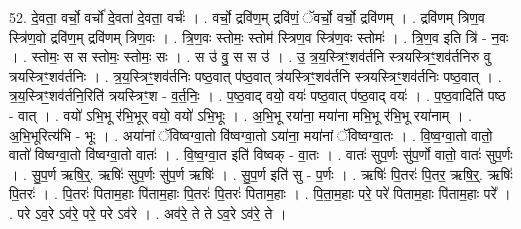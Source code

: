 \documentclass[17pt]{extarticle}
\begin{document}
52. दे॒वता॒ वर्चो॒ वर्चो॑ दे॒वता॑ दे॒वता॒ वर्चः॑ । . वर्चो॒ द्रवि॑ण॒म् द्रवि॑णं॒ ॅवर्चो॒ वर्चो॒ द्रवि॑णम् । . द्रवि॑णम् त्रिण॒व स्त्रि॑ण॒वो द्रवि॑ण॒म् द्रवि॑णम् त्रिण॒वः । . त्रि॒ण॒वः स्तोमः॒ स्तोम॑ स्त्रिण॒व स्त्रि॑ण॒वः स्तोमः॑ । . त्रि॒ण॒व इति त्रि॑ - न॒वः । . स्तोमः॒ स स स्तोमः॒ स्तोमः॒ सः । . स उ॑ वु॒ स स उ॑ । . उ॒ त्र॒य॒स्त्रिꣳ॒॒शव॑र्तनि स्त्रयस्त्रिꣳ॒॒शव॑र्तनिरु वु त्रयस्त्रिꣳ॒॒शव॑र्तनिः । . त्र॒य॒स्त्रिꣳ॒॒शव॑र्तनिः पष्ठ॒वात् प॑ष्ठ॒वात् त्र॑यस्त्रिꣳ॒॒शव॑र्तनि स्त्रयस्त्रिꣳ॒॒शव॑र्तनिः पष्ठ॒वात् । . त्र॒य॒स्त्रिꣳ॒॒शव॑र्तनि॒रिति॑ त्रयस्त्रिꣳ॒॒श - व॒र्त॒निः॒ । . प॒ष्ठ॒वाद् वयो॒ वयः॑ पष्ठ॒वात् प॑ष्ठ॒वाद् वयः॑ । . प॒ष्ठ॒वादिति॑ पष्ठ - वात् । . वयो॑ ऽभि॒भू र॑भि॒भूर् वयो॒ वयो॑ ऽभि॒भूः । . अ॒भि॒भू रया॑ना॒ मया॑ना मभि॒भू र॑भि॒भू रया॑नाम् । . अ॒भि॒भूरित्य॑भि - भूः । . अया॑नां ॅविष्वग्वा॒तो वि॑ष्वग्वा॒तो ऽया॑ना॒ मया॑नां ॅविष्वग्वा॒तः । . वि॒ष्व॒ग्वा॒तो वातो॒ वातो॑ विष्वग्वा॒तो वि॑ष्वग्वा॒तो वातः॑ । . वि॒ष्व॒ग्वा॒त इति॑ विष्वक् - वा॒तः । . वातः॑ सुप॒र्णः सु॑प॒र्णो वातो॒ वातः॑ सुप॒र्णः । . सु॒प॒र्ण ऋषि॒र्॒. ऋषिः॑ सुप॒र्णः सु॑प॒र्ण ऋषिः॑ । . सु॒प॒र्ण इति॑ सु - प॒र्णः । . ऋषिः॑ पि॒तरः॑ पि॒तर॒ ऋषि॒र्॒. ऋषिः॑ पि॒तरः॑ । . पि॒तरः॑ पिताम॒हाः पि॑ताम॒हाः पि॒तरः॑ पि॒तरः॑ पिताम॒हाः । . पि॒ता॒म॒हाः परे॒ परे॑ पिताम॒हाः पि॑ताम॒हाः परे᳚ । . परे ऽव॒रे ऽव॑रे॒ परे॒ परे ऽव॑रे । . अव॑रे॒ ते ते ऽव॒रे ऽव॑रे॒ ते । \newline
\end{document}
